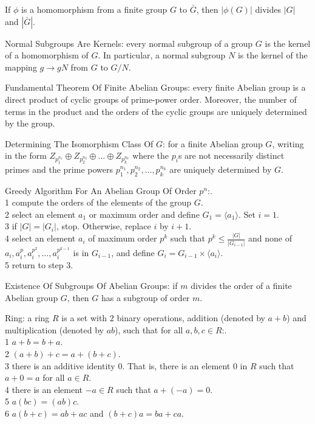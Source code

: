 If $\phi$ is a homomorphism from a finite group $G$ to $\bar{G}$, then $|\phi (G)|$ divides $|G|$ and $|\bar{G}|$.

Normal Subgroups Are Kernels: every normal subgroup of a group $G$ is the kernel of a homomorphism of $G$. In particular, a normal subgroup $N$ is the kernel of the mapping $g \to gN$ from $G$ to $G/N$.

Fundamental Theorem Of Finite Abelian Groups: every finite Abelian group is a direct product of cyclic groups of prime-power order. Moreover, the number of terms in the product and the orders of the cyclic groups are uniquely determined by the group.

Determining The Isomorphism Class Of $G$: for a finite Abelian group $G$, writing in the form $Z_{p_1^{n_1}} \oplus Z_{p_2^{n_2}} \oplus \dots \oplus Z_{p_k^{n_k}}$ where the $p_i$s are not necessarily distinct primes and the prime powers $p_1^{n_1},p_2^{n_2},\dots,p_k^{n_k}$ are uniquely determined by $G$.

Greedy Algorithm For An Abelian Group Of Order $p^n$:. \\
1 compute the orders of the elements of the group $G$. \\
2 select an element $a_1$ or maximum order and define $G_1 = \langle a_1 \rangle$. Set $i=1$. \\
3 if $|G|=|G_i|$, stop. Otherwise, replace $i$ by $i+1$. \\
4 select an element $a_i$ of maximum order $p^k$ such that $p^k \le \frac{|G|}{|G_{i-1}|}$ and none of $a_i,a_i^p,a_i^{p^2},\dots,a_i^{p^{k-1}}$ is in $G_{i-1}$, and define $G_i = G_{i-1} \times \langle a_i \rangle$. \\
5 return to step $3$.

Existence Of Subgroups Of Abelian Groups: if $m$ divides the order of a finite Abelian group $G$, then $G$ has a subgroup of order $m$.

Ring: a ring $R$ is a set with $2$ binary operations, addition (denoted by $a+b$) and multiplication (denoted by $ab$), such that for all $a,b,c \in R$:. \\
1 $a+b=b+a$. \\
2 $(a+b)+c=a+(b+c)$. \\
3 there is an additive identity $0$. That is, there is an element $0$ in $R$ such that $a+0=a$ for all $a \in R$. \\
4 there is an element $-a \in R$ such that $a+(-a)=0$. \\
5 $a(bc)=(ab)c$. \\
6 $a(b+c)=ab+ac$ and $(b+c)a=ba+ca$.

